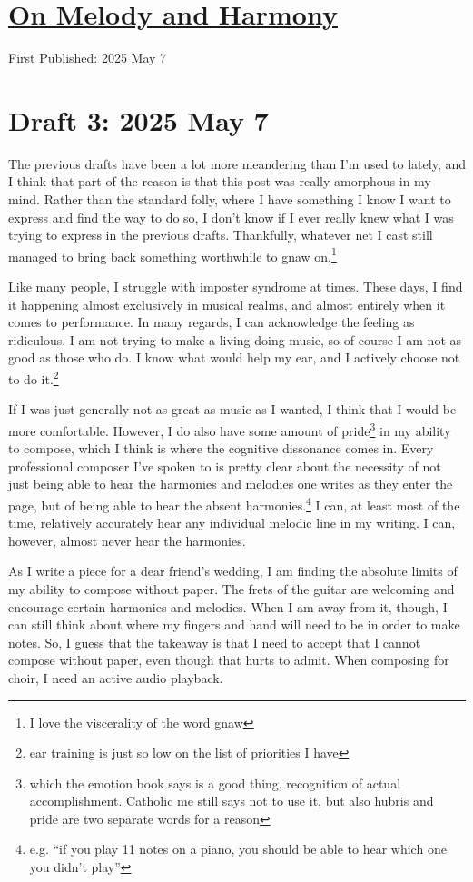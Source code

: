 \documentclass[12pt]{article}
\newcommand{\say}[1]{``#1''}
\renewcommand{\,}{\textsuperscript{,}}
\begin{document}
  
\doublespacing  
\section{\href{melody-harmony.html}{On Melody and Harmony}}  
First Published: 2025 May 7

\section{Draft 3: 2025 May 7}

The previous drafts have been a lot more meandering than I'm used to lately, and I think that part of the reason is that this post was really amorphous in my mind.  
Rather than the standard folly, where I have something I know I want to express and find the way to do so, I don't know if I ever really knew what I was trying to express in the previous drafts.  
Thankfully, whatever net I cast still managed to bring back something worthwhile to gnaw on.\footnote{I love the viscerality of the word gnaw}

Like many people, I struggle with imposter syndrome at times.  
These days, I find it happening almost exclusively in musical realms, and almost entirely when it comes to performance.  
In many regards, I can acknowledge the feeling as ridiculous.  
I am not trying to make a living doing music, so of course I am not as good as those who do.  
I know what would help my ear, and I actively choose not to do it.\footnote{ear training is just so low on the list of priorities I have}

If I was just generally not as great as music as I wanted, I think that I would be more comfortable.  
However, I do also have some amount of pride\footnote{which the emotion book says is a good thing, recognition of actual accomplishment. Catholic me still says not to use it, but also hubris and pride are two separate words for a reason} in my ability to compose, which I think is where the cognitive dissonance comes in.  
Every professional composer I've spoken to is pretty clear about the necessity of not just being able to hear the harmonies and melodies one writes as they enter the page, but of being able to hear the absent harmonies.\footnote{e.g. \say{if you play 11 notes on a piano, you should be able to hear which one you didn't play}}  
I can, at least most of the time, relatively accurately hear any individual melodic line in my writing.  
I can, however, almost never hear the harmonies.

As I write a piece for a dear friend's wedding, I am finding the absolute limits of my ability to compose without paper.  
The frets of the guitar are welcoming and encourage certain harmonies and melodies.  
When I am away from it, though, I can still think about where my fingers and hand will need to be in order to make notes.  
So, I guess that the takeaway is that I need to accept that I cannot compose without paper, even though that hurts to admit.  
When composing for choir, I need an active audio playback.
\end{document}
